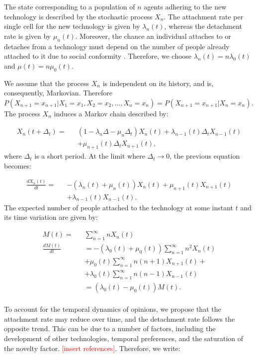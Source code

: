 The state corresponding to a population of $n$ agents adhering to the new technology is described by the stochastic process $X_n$. The attachment rate per single cell for the new technology is given by $\lambda_n(t)$, whereas the detachment rate is given by $\mu_n(t)$. Moreover, the chance an individual attaches to or detaches from a technology must depend on the number of people already attached to it due to social conformity \cite{herd,EuEcon}. Therefore, we choose $\lambda_n(t)=n\lambda_0(t)$ and $\mu(t)=n\mu_0(t).$

We assume that the process $X_n$ is independent on its history, and is, consequently, Markovian. Therefore $P(X_{n+1}=x_{n+1}|X_1=x_1,X_2=x_2,\hdots,X_n=x_n)=P(X_{n+1}=x_{n+1}|X_n=x_n)$. The process $X_n$ induces a Markov chain described by:

\begin{eqnarray}
    X_n(t+\Delta_t)=&&(1-\lambda_n\Delta-\mu_n\Delta_t)X_n(t)+\lambda_{n-1}(t)\Delta_t X_{n-1}(t)\nonumber\\
    &&+\mu_{n+1}(t)\Delta_t X_{n+1}(t),
\end{eqnarray}
where $\Delta_t$ is a short period. At the limit where $\Delta_t\rightarrow 0$, the previous equation becomes:

\begin{eqnarray}
    \frac{dX_n(t)}{dt}=&&-(\lambda_n(t)+\mu_n(t))X_n(t)+\mu_{n+1}(t)X_{n+1}(t)\nonumber\\
    &&+\lambda_{n-1}(t)X_{n-1}(t).
\end{eqnarray}
The expected number of people attached to the technology at some instant $t$ and its time variation are given by:

\begin{eqnarray}
        M(t)=&&\sum_{n=1}^\infty nX_n(t)\nonumber\\
        \frac{dM(t)}{dt}&&=-\left(\lambda_0(t)+\mu_0(t)\right)\sum_{n=1}^\infty n^2X_n(t)\nonumber\\
        &&+\mu_0(t)\sum_{n=1}^\infty n(n+1)X_{n+1}(t)+\nonumber\\
        &&+\lambda_0(t)\sum_{n=1}^\infty n(n-1)X_{n-1}(t)\nonumber\\
        &&=\left(\lambda_0(t)-\mu_0(t)\right)M(t).\\
\end{eqnarray}

To account for the temporal dynamics of opinions, we propose that the attachment rate may reduce over time, and the detachment rate follows the opposite trend. This can be due to a number of factors, including the development of other technologies, temporal preferences, and the saturation of the novelty factor. \textcolor{red}{[insert references]}. Therefore, we write:

